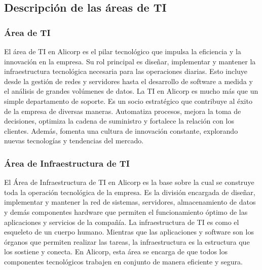 
\subsection{Descripción de las áreas de TI}
    \subsubsection{Área de TI}
    El área de TI en Alicorp es el pilar tecnológico que impulsa la eficiencia y la innovación en la empresa. Su rol principal es diseñar, implementar y mantener la infraestructura tecnológica necesaria para las operaciones diarias. Esto incluye desde la gestión de redes y servidores hasta el desarrollo de software a medida y el análisis de grandes volúmenes de datos. 
    La TI en Alicorp es mucho más que un simple departamento de soporte. Es un socio estratégico que contribuye al éxito de la empresa de diversas maneras. Automatiza procesos, mejora la toma de decisiones, optimiza la cadena de suministro y fortalece la relación con los clientes. Además, fomenta una cultura de innovación constante, explorando nuevas tecnologías y tendencias del mercado. 
    \subsubsection{Área de Infraestructura de TI}
    El Área de Infraestructura de TI en Alicorp es la base sobre la cual se construye toda la operación tecnológica de la empresa. Es la división encargada de diseñar, implementar y mantener la red de sistemas, servidores, almacenamiento de datos y demás componentes hardware que permiten el funcionamiento óptimo de las aplicaciones y servicios de la compañía. 
    La infraestructura de TI es como el esqueleto de un cuerpo humano. Mientras que las aplicaciones y software son los órganos que permiten realizar las tareas, la infraestructura es la estructura que los sostiene y conecta. En Alicorp, esta área se encarga de que todos los componentes tecnológicos trabajen en conjunto de manera eficiente y segura. 
